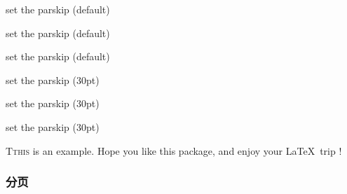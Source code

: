 \documentclass{ctexart}
\begin{document}
            \setlength{\parskip}{0pt plus 1pt} %

            set the parskip (default)

            set the parskip (default)

            set the parskip (default)

            {\setlength{\parskip}{30pt}
            
            set the parskip (30pt)

            set the parskip (30pt)

            set the parskip (30pt)
            }

            \lettrine{T}{this} is an example. Hope you like this package, and enjoy your \LaTeX\ trip !
            
        \subsubsection{分页}
            \newpage %
            \mbox{}
            \newpage
        
\end{document}
